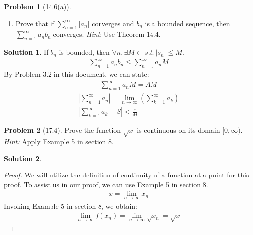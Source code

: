 \documentclass[12pt]{article}
\theoremstyle{definition} %
\newtheorem{solution}{Solution}
\newtheorem{problem}{Problem}
\theoremstyle{plain} %
\begin{document}
\begin{problem}[14.6(a)]
    \begin{enumerate}
        \item Prove that if $\sum_{n=1}^{\infty} \left\vert a_{n}  \right\vert $ converges and $b_{n} $ is a bounded sequence, then $\sum_{n=1}^{\infty} a_{n}b_{n} $ converges. \emph{Hint}: Use Theorem 14.4. 
    \end{enumerate}
    
\end{problem}
\begin{solution}
   If $b_{n}$ is bounded, then $\forall n, \exists M\in \ s.t. \ \left\vert s_{n} \right\vert\leq M $. 
   \begin{align}
      \sum_{n=1}^{\infty} a_{n}b_{n} \leq \sum_{n=1}^{\infty} a_{n}M
   \end{align}
   By Problem 3.2 in this document, we can state:
   \begin{align}
      \sum_{n=1}^{\infty} a_{n}M=AM
   \end{align}
   \begin{align}
      \left\vert \sum_{n=1}^{\infty} a_{n} \right\vert = \lim_{n \to \infty} \left( \sum_{k=1}^{\infty} a_{k} \right) \\[10pt] 
      \left\vert \sum_{k=1}^{\infty} a_{k}-S \right\vert <\frac{\varepsilon}{M}
   \end{align}

\end{solution}

\begin{problem}[17.4]
   Prove the function $\sqrt{x} $ is continuous on its domain $[0,\infty )$. \emph{Hint:} Apply Example 5 in section 8. 
\end{problem}
\begin{solution}
   \begin{proof}
      We will utilize the definition of continuity of a function at a point for this proof. To assist us in our proof, we can use Example 5 in section 8.
      \begin{align}   
      x=\lim_{n \to \infty} x_{n}
      \end{align}
      Invoking Example 5 in section 8, we obtain: 
      \begin{align}   
      \lim_{n \to \infty} f(x_{n}) = \lim_{n \to \infty} \sqrt{x_{n}} = \sqrt{x}  
      \end{align}
   \end{proof} 
\end{solution}
\end{document}
